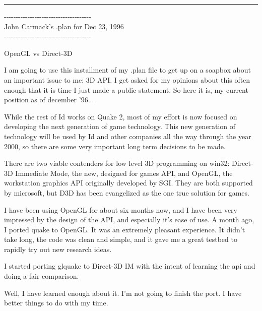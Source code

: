\label{openglvsdirectd}
\hrule \par \bigskip
\begin{allintypewriter}
{-}{-}{-}{-}{-}{-}{-}{-}{-}{-}{-}{-}{-}{-}{-}{-}{-}{-}{-}{-}{-}{-}{-}{-}{-}{-}{-}{-}{-}{-}{-}{-}{-}{-}{-}{-}{-}\\
John Carmack's .plan for Dec 23, 1996\\
{-}{-}{-}{-}{-}{-}{-}{-}{-}{-}{-}{-}{-}{-}{-}{-}{-}{-}{-}{-}{-}{-}{-}{-}{-}{-}{-}{-}{-}{-}{-}{-}{-}{-}{-}{-}{-}\\
\par
OpenGL vs Direct-3D\\
\par
I am going to use this installment of my .plan file to get up on a soapbox
about an important issue to me: 3D API. I get asked for my opinions about
this often enough that it is time I just made a public statement. So here
it is, my current position as of december '96...\\ 
\par
While the rest of Id works on Quake 2, most of my effort is now focused on
developing the next generation of game technology. This new generation of
technology will be used by Id and other companies all the way through the
year 2000, so there are some very important long term decisions to be made.\\ 
\par
There are two viable contenders for low level 3D programming on win32: 
Direct-3D Immediate Mode, the new, designed for games API, and OpenGL, the
workstation graphics API originally developed by SGI. They are both 
supported by microsoft, but D3D has been evangelized as the one true solution
for games.\\ 
\par
I have been using OpenGL for about six months now, and I have been very 
impressed by the design of the API, and especially it's ease of use. A month
ago, I ported quake to OpenGL. It was an extremely pleasant experience. It 
didn't take long, the code was clean and simple, and it gave me a great testbed
to rapidly try out new research ideas.\\ 
\par
I started porting glquake to Direct-3D IM with the intent of learning the api
and doing a fair comparison.\\ 
\par
Well, I have learned enough about it. I'm not going to finish the port. I have
better things to do with my time.\\ 

\end{allintypewriter}

